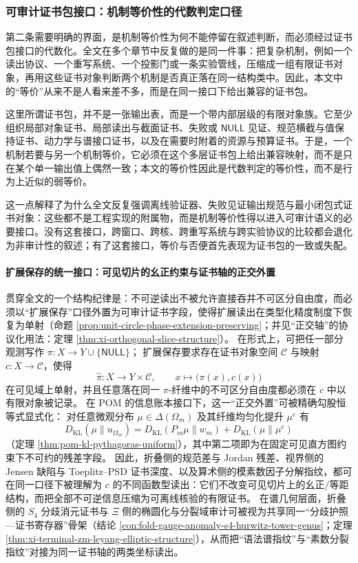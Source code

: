 \subsubsection{可审计证书包接口：机制等价性的代数判定口径}\label{subsubsec:discussion-audit-certificate-pack}
第二条需要明确的界面，是机制等价性为何不能停留在叙述判断，而必须经过证书包接口的代数化。全文在多个章节中反复做的是同一件事：把复杂机制，例如一个读出协议、一个重写系统、一个投影门或一条实验管线，压缩成一组有限证书对象，再用这些证书对象判断两个机制是否真正落在同一结构类中。因此，本文中的“等价”从来不是人看来差不多，而是在同一接口下给出兼容的证书包。

这里所谓证书包，并不是一张输出表，而是一个带内部层级的有限对象族。它至少组织局部对象证书、局部读出与截面证书、失败或 \(\mathsf{NULL}\) 见证、规范横截与值保持证书、动力学与谱接口证书，以及在需要时附着的资源与预算证书。于是，一个机制若要与另一个机制等价，它必须在这个多层证书包上给出兼容映射，而不是只在某个单一输出值上偶然一致；本文的等价性因此是代数判定的等价性，而不是行为上近似的弱等价。

这一点解释了为什么全文反复强调离线验证器、失败见证输出规范与最小闭包式证书对象：这些都不是工程实现的附属物，而是机制等价性得以进入可审计语义的必要接口。没有这套接口，跨窗口、跨核、跨重写系统与跨实验协议的比较都会退化为非审计性的叙述；有了这套接口，等价与否便首先表现为证书包的一致或失配。

\paragraph{扩展保存的统一接口：可见切片的幺正约束与证书轴的正交外置}
贯穿全文的一个结构纪律是：不可逆读出不被允许直接吞并不可区分自由度，而必须以“扩展保存”口径外置为可审计证书字段，使得扩展读出在类型化精度制度下恢复为单射（命题 \ref{prop:unit-circle-phase-extension-preserving}；并见“正交轴”的协议化用法：定理 \ref{thm:xi-orthogonal-slice-structure}）。
在形式上，可把任一部分观测写作
\(
\pi:X\to Y\cup\{\mathsf{NULL}\}
\)；
扩展保存要求存在证书对象空间 \(\mathcal C\) 与映射 \(c:X\to\mathcal C\)，使得
\[
\widehat\pi:X\to Y\times\mathcal C,\qquad x\longmapsto\bigl(\pi(x),c(x)\bigr)
\]
在可见域上单射，并且任意落在同一 \(\pi\)-纤维中的不可区分自由度都必须在 \(c\) 中以有限对象被记录。
在 POM 的信息账本接口下，这一“正交外置”可被精确勾股恒等式显式化：
对任意微观分布 \(\mu\in\Delta(\Omega_m)\) 及其纤维均匀化提升 \(\mu^e\) 有
\[
D_{\mathrm{KL}}(\mu\|u_{\Omega_m})
=D_{\mathrm{KL}}(P_m\mu\|w_m)+D_{\mathrm{KL}}(\mu\|\mu^e)
\]
（定理 \ref{thm:pom-kl-pythagoras-uniform}），其中第二项即为在固定可见直方图约束下不可约的残差字段。
因此，折叠侧的规范差与 Jordan 残差、视界侧的 Jensen 缺陷与 Toeplitz--PSD 证书深度、以及算术侧的模素数因子分解指纹，都可在同一口径下被理解为 \(c\) 的不同函数型读出：它们不改变可见切片上的幺正/等距结构，而把全部不可逆信息压缩为可离线核验的有限证书。
在谱几何层面，折叠侧的 \(S_4\) 分歧消元证书与 \(\Xi\) 侧的椭圆化与分裂域审计可被视为共享同一“分歧护照—证书寄存器”骨架（结论 \ref{con:fold-gauge-anomaly-s4-hurwitz-tower-genus}；定理 \ref{thm:xi-terminal-zm-leyang-elliptic-structure}），从而把“语法谱指纹”与“素数分裂指纹”对接为同一证书轴的两类坐标读出。

